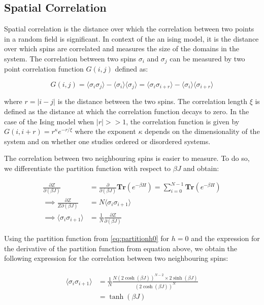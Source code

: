 \subsection{Spatial Correlation}
\label{sec:spatial_correlation}

Spatial correlation is the distance over which the correlation between two
points in a random field is significant. In context of the an ising model, it is
the distance over which spins are correlated and measures the size of the
domains in the system. The correlation between two spins $\sigma_i$ and
$\sigma_j$ can be measured by two point correlation function $G(i,j)$ defined
as:

\begin{equation}
  G(i,j) = \langle \sigma_i \sigma_j \rangle - \langle \sigma_i \rangle \langle \sigma_j \rangle = \langle \sigma_i \sigma_{i+r} \rangle - \langle \sigma_i \rangle \langle \sigma_{i+r} \rangle
\end{equation}

where $r = |i-j|$ is the distance between the two spins. The correlation length
$\xi$ is defined as the distance at which the correlation function decays to
zero. In the case of the Ising model when $|r|>>1$, the correlation function is
given by $G(i, i+r) = r^{\kappa} e^{-r/\xi}$ where the exponent $\kappa$ depends
on the dimensionality of the system and on whether one studies ordered or
disordered systems.

The correlation between two neighbouring spins is easier to measure. To do so,
we differentiate the partition function with respect to $\beta J$ and obtain:

\begin{align}
  \frac{\partial Z}{\partial (\beta J)} &= \frac{\partial}{\partial (\beta J)} \textbf{Tr}\left(e^{-\beta H}\right) = \sum_{i=0}^{N-1} \textbf{Tr}\left(e^{-\beta H}\right) \nonumber \\
  \implies \frac{\partial Z}{Z \partial (\beta J)} &= N \langle \sigma_i \sigma_{i+1} \rangle \\
  \implies \langle \sigma_i \sigma_{i+1} \rangle &= \frac{1}{N} \frac{\partial Z}{\partial (\beta J)} \nonumber
\end{align}

Using the partition function from \eqref{eq:partitionh0} for $h = 0$ and the
expression for the derivative of the partition function from equation above, we
obtain the following expression for the correlation between two neighbouring
spins:

\begin{align}
  \begin{split}  
    \langle \sigma_i \sigma_{i+1} \rangle &= \frac{1}{N} \frac{N (2 \cosh(\beta J))^{N-2} \times 2 \sinh(\beta J)}{(2 \cosh(\beta J))^N} \\
    &= \tanh(\beta J)
  \end{split}
\end{align}

